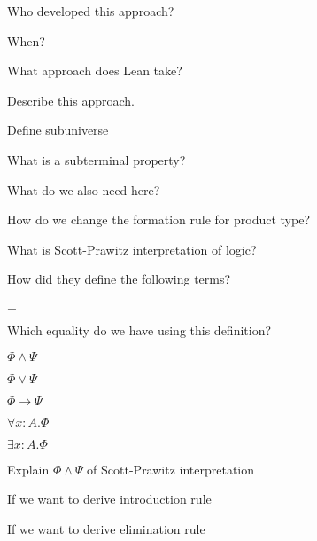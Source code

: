 \documentclass[fleqn]{article}
\begin{document}
\begin{enumerate}
\begin{itemize}
    \end{itemize}
    {\color{red}\item Who developed this approach?}
    {\color{red}\item When?}
    {\color{red}\item What approach does Lean take?}
    {\color{blue}\item Describe this approach.}
    {\color{red}\item Define subuniverse}
    {\color{blue}\item What is a subterminal property?}
    {\color{blue}\item What do we also need here?}
    {\color{red}\item How do we change the formation rule for product type?}
    {\color{red}\item What is Scott-Prawitz interpretation of logic?}
    \item How did they define the following terms?
    \begin{itemize}
        {\color{blue}\item $\bot$}
        {\color{red}\item Which equality do we have using this definition?}
        {\color{blue}\item $\Phi \wedge \Psi$}
        {\color{red}\item $\Phi \vee \Psi$}
        \item $\Phi \rightarrow \Psi$
        {\color{red}\item $\forall x : A. \Phi$}
        {\color{blue}\item $\exists x: A. \Phi$}
    \end{itemize}
    \item Explain $\Phi \wedge \Psi$ of Scott-Prawitz interpretation
    \begin{itemize}
        {\color{blue}\item If we want to derive introduction rule}
        {\color{blue}\item If we want to derive elimination rule }
    \end{itemize}    
\end{enumerate}
\end{document}
